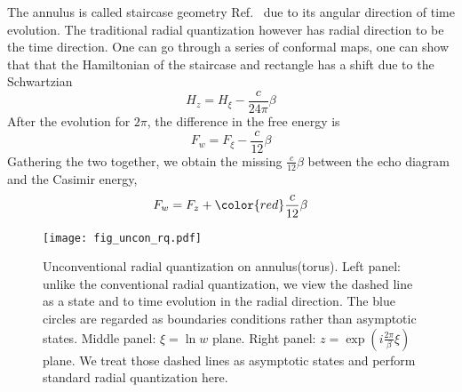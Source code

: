 The annulus is called staircase geometry Ref.~ due to its angular direction of time evolution. The traditional radial quantization however has radial direction to be the time direction. One can go through a series of conformal maps, one can show that that the Hamiltonian of the staircase and rectangle has a shift due to the Schwartzian
\begin{equation}
H_{z} = H_{\xi} - \frac{c}{24\pi} \beta 
\end{equation}
After the evolution for $2\pi$, the difference in the free energy is
\begin{equation}
F_w = F_{\xi} - \frac{c}{12} \beta 
\end{equation}
Gathering the two together, we obtain the missing $\frac{c}{12} \beta$ between the echo diagram and the Casimir energy, 
\begin{equation}
F_{w} = F_z + {\color{red} \frac{c}{12}\beta }
\end{equation}
\begin{figure}[h]
\centering
\texttt{[image: fig\_uncon\_rq.pdf]}
\caption{Unconventional radial quantization on annulus(torus). Left panel: unlike the conventional radial quantization, we view the dashed line as a state and to time evolution in the radial direction. The blue circles are regarded as boundaries conditions rather than asymptotic states. Middle panel: $\xi = \ln w$ plane. Right panel: $z = \exp(i \frac{2\pi}{\beta} \xi)$ plane. We treat those dashed lines as asymptotic states and perform standard radial quantization here.}
\label{fig:uncon_rq}
\end{figure}


